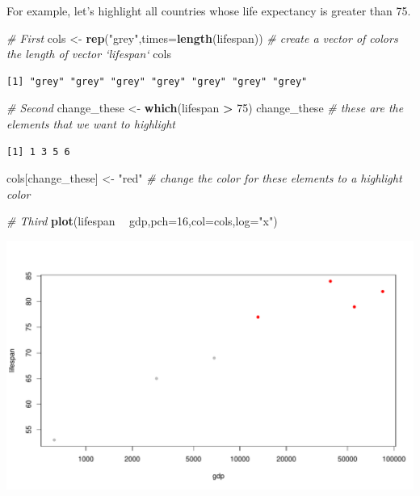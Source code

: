 \documentclass[
]{book}
\newenvironment{Shaded}{\begin{snugshade}}{\end{snugshade}}
\newcommand{\CommentTok}[1]{\textcolor[rgb]{0.56,0.35,0.01}{\textit{#1}}}
\newcommand{\DataTypeTok}[1]{\textcolor[rgb]{0.13,0.29,0.53}{#1}}
\newcommand{\DecValTok}[1]{\textcolor[rgb]{0.00,0.00,0.81}{#1}}
\newcommand{\KeywordTok}[1]{\textcolor[rgb]{0.13,0.29,0.53}{\textbf{#1}}}
\newcommand{\NormalTok}[1]{#1}
\newcommand{\OperatorTok}[1]{\textcolor[rgb]{0.81,0.36,0.00}{\textbf{#1}}}
\newcommand{\StringTok}[1]{\textcolor[rgb]{0.31,0.60,0.02}{#1}}
\begin{document}
For example, let's highlight all countries whose life expectancy is greater than 75.

\begin{Shaded}
\begin{Highlighting}[]
\CommentTok{# First}
\NormalTok{cols <-}\StringTok{ }\KeywordTok{rep}\NormalTok{(}\StringTok{"grey"}\NormalTok{,}\DataTypeTok{times=}\KeywordTok{length}\NormalTok{(lifespan)) }\CommentTok{# create a vector of colors the length of vector `lifespan`}
\NormalTok{cols}
\end{Highlighting}
\end{Shaded}

\begin{verbatim}
[1] "grey" "grey" "grey" "grey" "grey" "grey" "grey"
\end{verbatim}

\begin{Shaded}
\begin{Highlighting}[]
\CommentTok{# Second}
\NormalTok{change_these <-}\StringTok{ }\KeywordTok{which}\NormalTok{(lifespan }\OperatorTok{>}\StringTok{ }\DecValTok{75}\NormalTok{) }
\NormalTok{change_these }\CommentTok{# these are the elements that we want to highlight}
\end{Highlighting}
\end{Shaded}

\begin{verbatim}
[1] 1 3 5 6
\end{verbatim}

\begin{Shaded}
\begin{Highlighting}[]
\NormalTok{cols[change_these] <-}\StringTok{ "red"}  \CommentTok{# change the color for these elements to a highlight color}

\CommentTok{# Third}
\KeywordTok{plot}\NormalTok{(lifespan }\OperatorTok{~}\StringTok{ }\NormalTok{gdp,}\DataTypeTok{pch=}\DecValTok{16}\NormalTok{,}\DataTypeTok{col=}\NormalTok{cols,}\DataTypeTok{log=}\StringTok{"x"}\NormalTok{)}
\end{Highlighting}
\end{Shaded}

\includegraphics{figures/unnamed-chunk-107-1.pdf}
\end{document}
